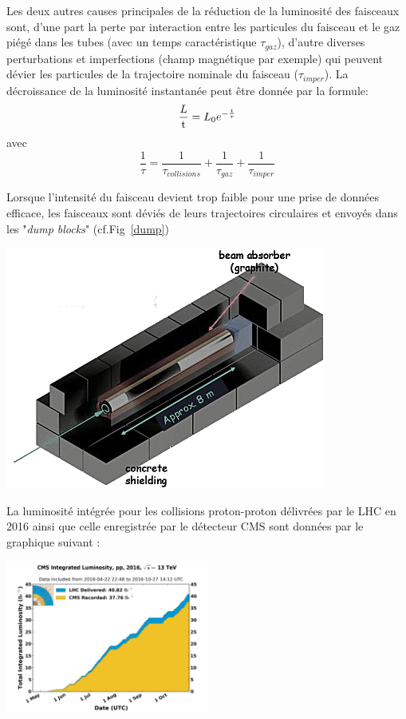 Les deux autres causes principales de la réduction de la luminosité des faisceaux sont, d'une part la perte par interaction entre les particules du faisceau et le gaz piégé dans les tubes (avec un temps caractéristique $\tau_{gaz}$), d'autre diverses perturbations et imperfections (champ magnétique par exemple) qui peuvent dévier les particules de la trajectoire nominale du faisceau ($\tau_{imper}$). 
La décroissance de la luminosité instantanée peut être donnée par la formule:
\begin{equation}
\frac{\mathrm \mathcal{L}}{\mathrm t} = L_{0} e^{-\frac{t}{\tau}}
\end{equation}
avec
\begin{equation}
\frac{1}{\tau} = \frac{1}{\tau_{collisions}}+\frac{1}{\tau_{gaz}}+\frac{1}{\tau_{imper}}
\end{equation}

Lorsque l'intensité du faisceau devient trop faible pour une prise de données efficace, les faisceaux sont déviés de leurs trajectoires circulaires et envoyés dans les "\textit{dump blocks}" (cf.Fig~\ref{dump})
\marginpar
{
	\includegraphics[width=\marginparwidth]{LHC/dump.png}
    \captionsetup{type=figure}\caption{Schéma d'un \textit{"dump block"}.}
    	\label{dump}
}

La luminosité intégrée pour les collisions proton-proton délivrées par le LHC en \num{2016} ainsi que celle enregistrée par le détecteur CMS sont données par le graphique suivant :

\begin{minipagewithmarginpars}[ht!]{0.95\textwidth}
\centering
\includegraphics[width=0.50\textwidth]{LHC/luminosity.png}
    \captionsetup{type=figure}\caption{Luminosité intégrée en fonction du jour de l'année \num{2016} délivrée (bleu) et enregistrée (orange) par CMS pendant les faisceaux stables et pour les collisions $pp$, à \SI{13}{\tera\eV} d'énergie dans le centre de masse \cite{lumipileup}.}
\end{minipagewithmarginpars}

